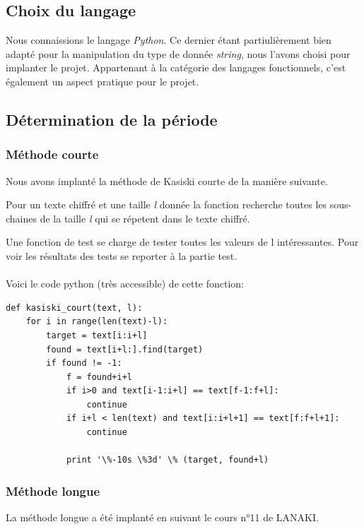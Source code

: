 \documentclass[a4paper, 11pt]{article}
\begin{document}
\subsection{Choix du langage}
Nous connaissions le langage \textit{Python}.
Ce dernier étant partiulièrement bien adapté pour la manipulation
du type de donnée \textit{string}, nous l'avons choisi pour implanter
le projet.
Appartenant à la catégorie des langages fonctionnels, c'est également
un aspect pratique pour le projet.

\subsection{Détermination de la période}

\subsubsection{Méthode courte}
Nous avons implanté la méthode de Kasiski courte de la manière
suivante.

Pour un texte chiffré et une taille \textit{l} donnée la fonction recherche toutes
les sous-chaines de la taille \textit{l} qui se répetent dans le texte
chiffré.

Une fonction de test se charge de tester toutes les valeurs de l
intéressantes.
Pour voir les résultats des tests se reporter à la partie test.

\paragraph{}
Voici le code python (très accessible) de cette fonction:
\newpage
\begin{lstlisting}
def kasiski_court(text, l):
    for i in range(len(text)-l):
        target = text[i:i+l]
        found = text[i+l:].find(target)
        if found != -1:
            f = found+i+l
            if i>0 and text[i-1:i+l] == text[f-1:f+l]:
                continue
            if i+l < len(text) and text[i:i+l+1] == text[f:f+l+1]:
                continue            

            print '\%-10s \%3d' \% (target, found+l)
\end{lstlisting}


\subsubsection{Méthode longue}
La méthode longue a été implanté en suivant le cours n°11 de LANAKI.
\end{document}
